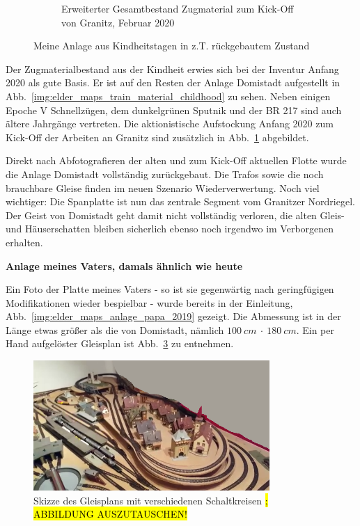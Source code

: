 \begin{figure}[h]
\begin{subfigure}[b]{0.49\textwidth}
   \caption{Erweiterter Gesamtbestand Zugmaterial zum Kick-Off von Granitz, Februar 2020}
    \label{img:elder_maps_train_material_kickoff}
    \end{subfigure}
	\caption{Meine Anlage aus Kindheitstagen in z.T. r\"uckgebautem Zustand}
	\label{img:elder_maps_domistadt}
\end{figure}

Der Zugmaterialbestand aus der Kindheit erwies sich bei der Inventur Anfang 2020 als gute Basis.
Er ist auf den Resten der Anlage Domistadt aufgestellt in Abb.~\ref{img:elder_maps_train_material_childhood} zu sehen.
Neben einigen Epoche V Schnellz\"ugen, dem dunkelgr\"unen Sputnik und der BR 217 sind auch \"altere Jahrg\"ange vertreten.
Die aktionistische Aufstockung Anfang 2020 zum Kick-Off der Arbeiten an Granitz sind zus\"atzlich in Abb.~\ref{img:elder_maps_train_material_kickoff} abgebildet.

Direkt nach Abfotografieren der alten und zum Kick-Off aktuellen Flotte wurde die Anlage Domistadt vollst\"andig zur\"uckgebaut.
Die Trafos sowie die noch brauchbare Gleise finden im neuen Szenario Wiederverwertung.
Noch viel wichtiger: Die Spanplatte ist nun das zentrale Segment vom Granitzer Nordriegel.
Der Geist von Domistadt geht damit nicht vollst\"andig verloren, die alten Gleis- und H\"auserschatten bleiben sicherlich ebenso noch irgendwo im Verborgenen erhalten.


\textbf{Anlage meines Vaters, damals \"ahnlich wie heute}

Ein Foto der Platte meines Vaters - so ist sie gegenw\"artig nach geringf\"ugigen Modifikationen wieder bespielbar - wurde bereits in der Einleitung, Abb.~\ref{img:elder_maps_anlage_papa_2019} gezeigt.
Die Abmessung ist in der L\"ange etwas gr\"o{\ss}er als die von Domistadt, n\"amlich $100~cm~\cdot~180~cm$.
Ein per Hand aufgel\"oster Gleisplan ist Abb.~\ref{img:elder_maps_anlage_papa_map_domi} zu entnehmen.

\begin{figure}[h]
\centering
  \includegraphics[width=0.8\textwidth]{img/elder_maps/anlage_papa_2019.png}
	\caption{Skizze des Gleisplans mit verschiedenen Schaltkreisen\hl{ ; ABBILDUNG AUSZUTAUSCHEN!}}
	\label{img:elder_maps_anlage_papa_map_domi}
\end{figure}

